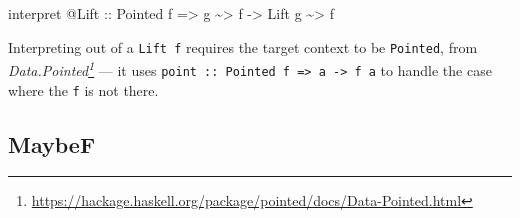 \documentclass[]{article}
\newenvironment{Shaded}{}{}
\newcommand{\DataTypeTok}[1]{\textcolor[rgb]{0.56,0.13,0.00}{#1}}
\newcommand{\NormalTok}[1]{#1}
\newcommand{\OperatorTok}[1]{\textcolor[rgb]{0.40,0.40,0.40}{#1}}
\newcommand{\OtherTok}[1]{\textcolor[rgb]{0.00,0.44,0.13}{#1}}
\renewcommand{\href}[2]{#2\footnote{\url{#1}}}
\begin{document}
\begin{itemize}
\begin{Shaded}
\begin{Highlighting}[]
\NormalTok{interpret }\OperatorTok{@}\DataTypeTok{Lift}
\OtherTok{    ::} \DataTypeTok{Pointed}\NormalTok{ f}
    \OtherTok{=>}\NormalTok{ g }\OperatorTok{\textasciitilde{}>}\NormalTok{ f}
    \OtherTok{{-}>} \DataTypeTok{Lift}\NormalTok{ g }\OperatorTok{\textasciitilde{}>}\NormalTok{ f}
\end{Highlighting}
\end{Shaded}

  Interpreting out of a \texttt{Lift\ f} requires the target context to be
  \texttt{Pointed}, from
  \emph{\href{https://hackage.haskell.org/package/pointed/docs/Data-Pointed.html}{Data.Pointed}}
  --- it uses
  \texttt{point\ ::\ Pointed\ f\ =\textgreater{}\ a\ -\textgreater{}\ f\ a} to
  handle the case where the \texttt{f} is not there.
\end{itemize}

\hypertarget{maybef}{%
\subsection{MaybeF}\label{maybef}}
\end{document}

